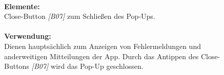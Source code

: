 \documentclass[a4paper]{scrreprt}
\begin{document}
\begin{figure}[h!]
\begin{minipage}[b]{0.55\linewidth}
    			\hfill 
    			\\\textbf{Elemente:}\\
    			Close-Button \textit{{[}B07{]}} zum 
    			Schließen des Pop-Ups.\\
    			
    				
    			
    			\hfill
    			\\
    			
    			\textbf{Verwendung:}\\
    			Dienen hauptsächlich zum Anzeigen von
    			Fehlermeldungen und anderweitigen
    			Mitteilungen der App. Durch das Antippen des 
    			Close-Buttons \textit{{[}B07{]}} wird das Pop-Up geschlossen.
    			
    			
    			\vspace{17mm}
    			
    		\end{minipage}
    	\end{figure}
    	
    	\clearpage
    	
\end{document}
